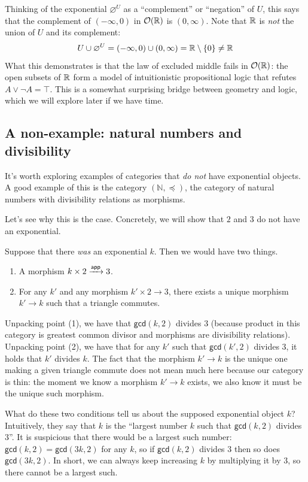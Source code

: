 Thinking of the exponential \(\varnothing^U\) as a ``complement'' or ``negation'' of \(U\),
this says that the complement of \((-\infty,0)\) in \(\mathcal O(\mathbb R)\) is \((0,\infty)\).
Note that \(\mathbb R\) is \emph{not} the union of \(U\) and its complement:
\[
U \cup \varnothing^U
=
(-\infty,0) \cup (0,\infty)
=
\mathbb R\setminus\{0\}
\ne \mathbb R
\]
What this demonstrates is that the law of excluded middle fails in \(\mathcal
O(\mathbb R)\): the open subsets of \(\mathbb R\) form a model of intuitionistic propositional
logic that refutes \(A \lor \neg A = \top\). This is a somewhat surprising
bridge between geometry and logic, which we will explore later if we have
time.

\subsection{A non-example: natural numbers and divisibility}
It's worth exploring examples of categories that \emph{do not}
have exponential objects. A good example of this
is the category $(\mathbb{N}, \preceq)$, the category of
natural numbers with divisibility relations as morphisms.

Let's see why this is the case.
Concretely, we will show that \(2\) and \(3\)
do not have an exponential.

Suppose that there \emph{was} an exponential \(k\).
Then we would have two things.
\begin{enumerate}
\item A morphism \(k \times 2 \xrightarrow{\mathsf{app}} 3\).
\item For any \(k'\)
and any morphism \(k' \times 2 \to 3\),
there exists a unique morphism \(k' \to k\) such that
a triangle commutes.
\end{enumerate}
Unpacking point (1),
we have that \(\mathsf{gcd}(k,2)\) divides \(3\) (because product in this
category is greatest common divisor and morphisms are divisibility relations).
Unpacking point (2), we have that for any \(k'\) such that \(\mathsf{gcd}(k',2)\) divides \(3\),
it holds that \(k'\) divides \(k\). The fact that the morphism \(k' \to k\)
is the unique one making a given triangle commute does not mean much here because our category
is thin: the moment we know a morphism \(k' \to k\) exists, we also know it must be the unique
such morphism.

What do these two conditions tell us about the supposed exponential object \(k\)?
Intuitively, they say that \(k\) is the ``largest number \(k\) such that \(\mathsf{gcd}(k,2)\) divides \(3\)''.
It is suspicious that there would be a largest such number: \(\mathsf{gcd}(k,2) = \mathsf{gcd}(3k,2)\)
for any \(k\), so if \(\mathsf{gcd}(k,2)\) divides \(3\) then so does \(\mathsf{gcd}(3k,2)\).
In short, we can always keep increasing \(k\) by multiplying it by \(3\), so there cannot be a largest such.

